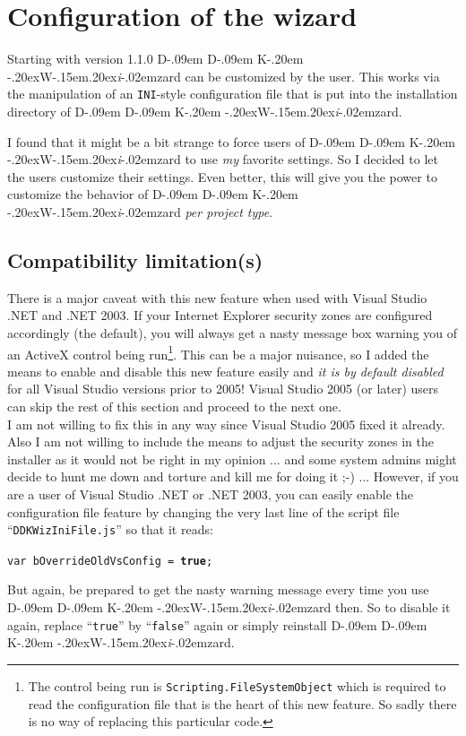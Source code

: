 \documentclass[a4paper,titlepage]{report}
\def\ddkwiz{D\kern-.09em D\kern-.09em K\kern-.20em \raise-.20ex\hbox{W}\kern-.15em\raise.20ex\hbox{\it{i}}\kern-.02em{zard}}
\begin{document}
\chapter{Configuration of the wizard}\thispagestyle{fancy}
Starting with version 1.1.0 \ddkwiz{} can be customized by the user. This works
via the manipulation of an \texttt{INI}-style configuration file that is put into the
installation directory of \ddkwiz{}.

I found that it might be a bit strange to force users of \ddkwiz{} to use \emph{my}
favorite settings. So I decided to let the users customize their settings. Even better,
this will give you the power to customize the behavior of \ddkwiz{} \emph{per project
type}.

\section{Compatibility limitation(s)}
\label{compat:activex}
There is a major caveat with this new feature when used with
Visual Studio .NET and .NET 2003. If your Internet Explorer security zones
are configured accordingly (the default), you will always get a nasty message box
warning you of an ActiveX control being run\footnote{The control being run is
\texttt{Scripting.FileSystemObject} which is required to read the configuration
file that is the heart of this new feature. So sadly there is no way of
replacing this particular code.}. This can be a major nuisance, so I
added the means to enable and disable this new feature easily and \emph{it is by default
disabled} for all Visual Studio versions prior to 2005! Visual Studio 2005 (or later)
users can skip the rest of this section and proceed to the next one.\\

I am not willing to fix this in any way since Visual Studio 2005 fixed it already.
Also I am not willing to include the means to adjust the security zones in
the installer as it would not be right in my opinion ... and some system admins
might decide to hunt me down and torture and kill me for doing it \textsf{;-)} ...
However, if you are a user of Visual Studio .NET or .NET 2003, you can easily
enable the configuration file feature by changing the very last line of the
script file ``\texttt{DDKWizIniFile.js}'' so that it reads:

\texttt{var bOverrideOldVsConfig = \textbf{true};}

But again, be prepared to get the nasty warning message every time you use \ddkwiz{}
then. So to disable it again, replace ``\texttt{true}'' by ``\texttt{false}'' again
or simply reinstall \ddkwiz{}.\\
\end{document}
